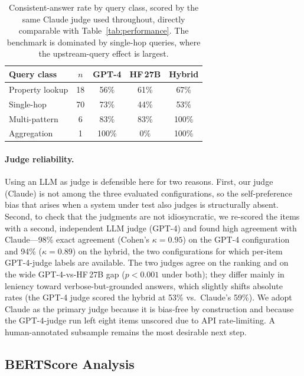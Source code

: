 \documentclass{ceurart}
\begin{document}
\begin{table}[ht]
  \caption{Consistent-answer rate by query class, scored by the same Claude judge
           used throughout, directly comparable with Table~\ref{tab:performance}. The
           benchmark is dominated by single-hop queries, where the upstream-query
           effect is largest.}
  \label{tab:byclass}
  \centering
  \begin{tabular}{lcccc}
    \toprule
    \textbf{Query class} & \textbf{$n$} & \textbf{GPT-4} & \textbf{HF\,27B} & \textbf{Hybrid} \\
    \midrule
    Property lookup  & 18 & 56\%  & 61\% & 67\%  \\
    Single-hop       & 70 & 73\%  & 44\% & 53\%  \\
    Multi-pattern    &  6 & 83\%  & 83\% & 100\% \\
    Aggregation      &  1 & 100\% & 0\%  & 100\% \\
    \bottomrule
  \end{tabular}
\end{table}

\paragraph{Judge reliability.}
Using an LLM as judge is defensible here for two reasons. First, our judge (Claude)
is not among the three evaluated configurations, so the self-preference bias that
arises when a system under test also judges is structurally absent. Second, to check
that the judgments are not idiosyncratic, we re-scored the items with a second,
independent LLM judge (GPT-4) and found high agreement with Claude---98\% exact
agreement (Cohen's $\kappa=0.95$) on the GPT-4 configuration and 94\% ($\kappa=0.89$)
on the hybrid, the two configurations for which per-item GPT-4-judge labels are
available. The two judges agree on the ranking and on the wide GPT-4-vs-HF\,27B gap
($p<0.001$ under both); they differ mainly in leniency toward verbose-but-grounded
answers, which slightly shifts absolute rates (the GPT-4 judge scored the hybrid at
53\% vs.\ Claude's 59\%). We adopt Claude as the primary judge because it is
bias-free by construction and because the GPT-4-judge run left eight items unscored
due to API rate-limiting. A human-annotated subsample remains the most desirable
next step.

\subsection{BERTScore Analysis}
\end{document}
